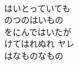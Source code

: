 \documentclass[10pt,b5j]{tarticle} %
\begin{document}
\begin{enumerate}
\begin{minipage}[c]{\blocksize}
    \end{minipage}
    \begin{minipage}[c]{\blocksize}
        
        \vspace{\linespace}
        \item~\\
        はいとっていても\\
        のつのはいもの\\
        をにんではいたが\\
        けてはれぬれ ヤレ\\
        はなものなもの
    
    \end{minipage}
\end{enumerate} %
\end{document}
